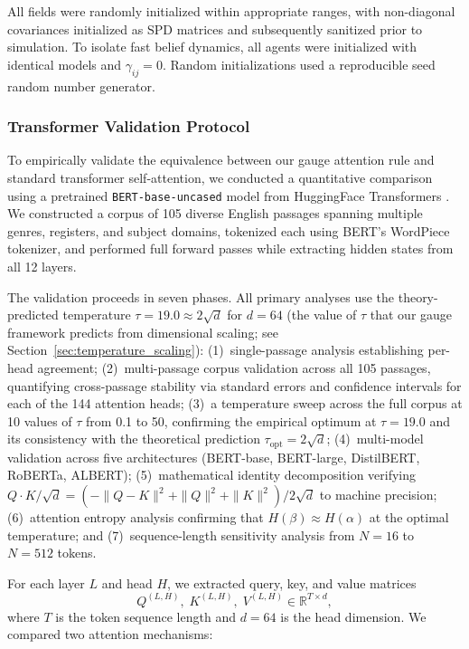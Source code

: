 \documentclass[twoside,11pt]{article}
\begin{document}
All fields were randomly initialized within appropriate ranges, with non-diagonal covariances initialized as SPD matrices and subsequently sanitized prior to simulation. To isolate fast belief dynamics, all agents were initialized with identical models and $\gamma_{ij} = 0$. Random initializations used a reproducible seed random number generator.

\subsubsection{Transformer Validation Protocol}
To empirically validate the equivalence between our gauge attention rule and standard transformer self-attention, we conducted a quantitative comparison using a pretrained \texttt{BERT-base-uncased} model from HuggingFace Transformers \citep{devlin2018bert}. We constructed a corpus of 105 diverse English passages spanning multiple genres, registers, and subject domains, tokenized each using BERT's WordPiece tokenizer, and performed full forward passes while extracting hidden states from all 12 layers.

The validation proceeds in seven phases. All primary analyses use the theory-predicted temperature $\tau = 19.0 \approx 2\sqrt{d}$ for $d = 64$ (the value of $\tau$ that our gauge framework predicts from dimensional scaling; see Section~\ref{sec:temperature_scaling}): (1)~single-passage analysis establishing per-head agreement; (2)~multi-passage corpus validation across all 105 passages, quantifying cross-passage stability via standard errors and confidence intervals for each of the 144 attention heads; (3)~a temperature sweep across the full corpus at 10 values of $\tau$ from 0.1 to 50, confirming the empirical optimum at $\tau = 19.0$ and its consistency with the theoretical prediction $\tau_{\text{opt}} = 2\sqrt{d}$; (4)~multi-model validation across five architectures (BERT-base, BERT-large, DistilBERT, RoBERTa, ALBERT); (5)~mathematical identity decomposition verifying $Q \cdot K / \sqrt{d} = (-\|Q-K\|^2 + \|Q\|^2 + \|K\|^2)/2\sqrt{d}$ to machine precision; (6)~attention entropy analysis confirming that $H(\beta) \approx H(\alpha)$ at the optimal temperature; and (7)~sequence-length sensitivity analysis from $N = 16$ to $N = 512$ tokens.

For each layer $L$ and head $H$, we extracted query, key, and value matrices
\[
Q^{(L,H)},\; K^{(L,H)},\; V^{(L,H)} \in \mathbb{R}^{T \times d},
\]
where $T$ is the token sequence length and $d = 64$ is the head dimension. We compared two attention mechanisms:
\end{document}

